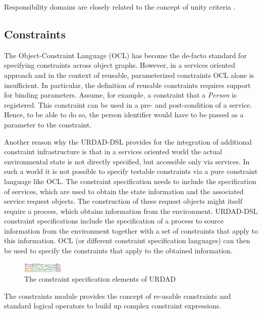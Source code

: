 Responsibility domains are closely related to the concept of unity criteria \cite{gonzalez_unity_2009}.


\subsection{Constraints}

The Object-Constraint Language (OCL) has become the de-facto standard for specifying constraints across object graphs. However, in a services oriented approach and in the context of reusable, parameterized constraints OCL alone is insufficient. In particular, the definition of reusable constraints requires support for binding parameters. Assume, for example, a constraint that a \emph{Person} is registered. This constraint can be used in a pre- and post-condition of a service. Hence, to be able to do so, the person identifier would have to be passed as a parameter to the constraint.

Another reason why the URDAD-DSL provides for the integration of additional constraint infrastructure is that in a services oriented world the actual environmental state is not directly specified, but accessible only via services. In such a world it is not possible to specify testable constraints via a pure constraint language like OCL. The constraint specification needs to include the specification of services, which are used to obtain the state information and the associated service request objects. The construction of these request objects might itself require a process, which obtains information from the environment. URDAD-DSL constraint specifications include the specification of a process to source information from the environment together with a set of constraints that apply to this information. OCL (or different constraint specification languages) can then be used to specify the constraints that apply to the obtained information.

\begin{figure}[Htbp]
  \centering
  \includegraphics{constraint}
  \caption{The constraint specification elements of URDAD}
  \label{fig:metamodel}
\end{figure}

The constraints module provides the concept of re-usable constraints and standard logical operators to build up complex constraint expressions.

